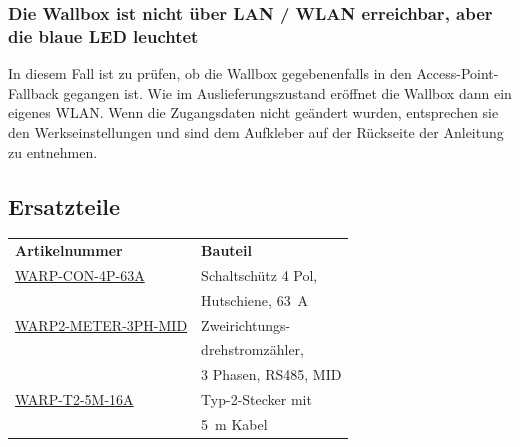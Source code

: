 \documentclass[a4paper,10pt]{article}
\begin{document}
\begin{multicols*}{2}
	\subsubsection*{Die Wallbox ist nicht über LAN / WLAN erreichbar, aber die blaue LED leuchtet}
	In diesem Fall ist zu prüfen, ob die Wallbox gegebenenfalls in den Access-Point-Fallback
	gegangen ist. Wie im Auslieferungszustand eröffnet die Wallbox dann ein eigenes
	WLAN. Wenn die Zugangsdaten nicht geändert wurden, entsprechen sie den Werkseinstellungen und sind dem
	Aufkleber auf der Rückseite der Anleitung zu entnehmen.

	\subsection{Ersatzteile}
	\begin{tabular}{ll}
		\textbf{Artikelnummer}                                                                                                      & \textbf{Bauteil}                     \\
		\cmidrule(lr{0.5em}){1-2}
		\href{https://www.tinkerforge.com/de/shop/warp/contactor-4-pole-din-rail-63a.html}{WARP-CON-4P-63A}                         & Schaltschütz 4 Pol,                  \\
		                                                                                                                            & Hutschiene, \SI{63}{\ampere}         \\
		\cmidrule(lr{0.5em}){1-2}
		\href{https://www.tinkerforge.com/de/shop/warp/warp2-spare-parts/contactor-4-pole-din-rail-63a.html}{WARP2-METER-3PH-MID}   & Zweirichtungs-                       \\
		                                                                                                                            & drehstromzähler,                     \\
		                                                                                                                            & 3 Phasen, RS485, MID                 \\
		\cmidrule(lr{0.5em}){1-2}
		\href{https://www.tinkerforge.com/de/shop/warp/warp2-spare-parts/type-2-plug-with-5m-cable-11kw-16a.html}{WARP-T2-5M-16A}   & Typ-2-Stecker mit                    \\
		                                                                                                                            & \SI{5}{\meter} Kabel                 \\

\end{tabular}
\end{multicols*}
\end{document}
